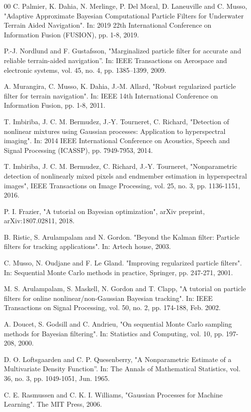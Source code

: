 \documentclass[conference]{IEEEtran}
\begin{document}
\begin{thebibliography}{00}
 C. Palmier, K. Dahia, N. Merlinge, P. Del Moral, D. Laneuville and C. Musso, "Adaptive Approximate Bayesian Computational Particle Filters for Underwater Terrain Aided Navigation". In: 2019 22th International Conference on Information Fusion (FUSION), pp. 1-8, 2019.

 P.-J. Nordlund and F. Gustafsson, "Marginalized particle filter for accurate and reliable terrain-aided navigation”. In: IEEE Transactions on Aerospace and electronic systems, vol. 45, no. 4, pp. 1385–1399, 2009.

 A. Murangira, C. Musso, K. Dahia, J.-M. Allard, "Robust regularized particle filter for terrain navigation". In: IEEE 14th International
Conference on Information Fusion, pp. 1-8, 2011.

 T. Imbiriba, J. C. M. Bermudez, J.-Y. Tourneret, C. Richard, "Detection of nonlinear mixtures using Gaussian processes: Application to hyperspectral imaging". In: 2014 IEEE International Conference on Acoustics, Speech and Signal Processing (ICASSP), pp. 7949-7953, 2014.

 T. Imbiriba, J. C. M. Bermudez, C. Richard, J.-Y. Tourneret, "Nonparametric detection of nonlinearly mixed pixels and endmember estimation in hyperspectral images", IEEE Transactions on Image
Processing, vol. 25, no. 3, pp. 1136-1151, 2016.

 P. I. Frazier, "A tutorial on Bayesian optimization", arXiv preprint, arXiv:1807.02811, 2018.

 B. Ristic, S. Arulampalam and N. Gordon. "Beyond the Kalman filter: Particle filters for tracking applications". In: Artech house, 2003.

 C. Musso, N. Oudjane and F. Le Gland. "Improving regularized particle filters". In: Sequential Monte Carlo methods in practice, Springer, pp. 247-271, 2001.

 M. S. Arulampalam, S. Maskell, N. Gordon and T. Clapp, "A tutorial on particle filters for online nonlinear/non-Gaussian Bayesian tracking". In: IEEE Transactions on Signal Processing, vol. 50, no. 2, pp. 174-188, Feb. 2002.

 A. Doucet, S. Godsill and C. Andrieu, "On sequential Monte Carlo sampling methods for Bayesian filtering". In: Statistics and Computing, vol. 10, pp. 197-208, 2000.

 D. O. Loftsgaarden and C. P. Quesenberry, "A Nonparametric Estimate of a Multivariate Density Function''. In: The Annals of Mathematical Statistics, vol. 36, no. 3, pp. 1049-1051, Jun. 1965.

 C. E. Rasmussen and C. K. I. Williams, "Gaussian Processes for Machine Learning". The MIT Press, 2006.
\end{thebibliography}
\end{document}
